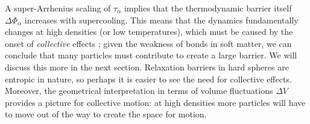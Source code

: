 



A super-Arrhenius scaling of $\tau_\alpha$ implies that the thermodynamic barrier itself $\Delta \Phi_\alpha$ increases with supercooling.
This means that the dynamics fundamentally changes at high densities (or low temperatures), which must be caused by the onset of \emph{collective} effects%
;
given the weakness of bonds in soft matter, we can conclude that many particles must contribute to create a large barrier.
We will discuss this more in the next section.
Relaxation barriers in hard spheres are entropic in nature, so perhaps it is easier to see the need for collective effects.
Moreover, the geometrical interpretation in terms of volume fluctuations $\Delta V$ provides a picture for collective motion: at high densities more particles will have to move out of the way to create the space for motion.

